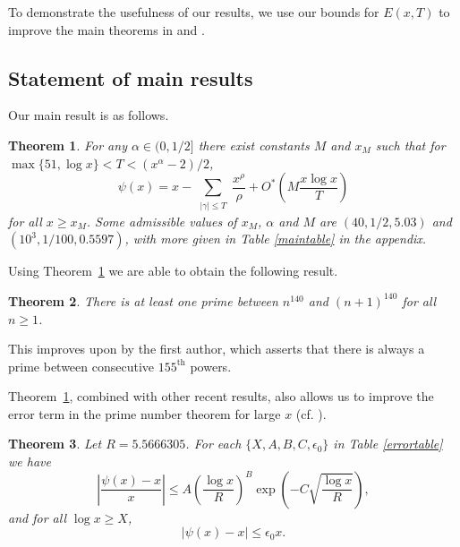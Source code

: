 \documentclass[reqno]{amsart}
\newtheorem{theorem}{Theorem}[section]
\numberwithin{equation}{section}
\theoremstyle{remark}
\begin{document}
To demonstrate the usefulness of our results, we use our bounds for $E(x,T)$ to improve the main theorems in \cite{cully2023primes} and \cite{P_T_2021}.

\subsection{Statement of main results}
Our main result is as follows.
\begin{theorem}\label{mainthm}
    For any $\alpha\in(0,1/2]$ there exist constants $M$ and $x_M$ such that for $\max\{51,\log x\}<T<(x^{\alpha}-2)/2$,
    \begin{equation}\label{oureq}
        \psi(x)=x-\sum_{\substack{|\gamma|\leq T}}\frac{x^\rho}{\rho}+O^*\left(M\frac{x\log x}{T}\right)
    \end{equation}
    for all $x\geq x_M$. Some admissible values of $x_M$, $\alpha$ and $M$ are $(40,1/2,5.03)$ and $(10^3, 1/100, 0.5597)$, with more given in Table \ref{maintable} in the appendix.
\end{theorem}
Using Theorem~\ref{mainthm} we are able to obtain the following result.
\begin{theorem}\label{powerthm}
    There is at least one prime between $n^{140}$ and $(n+1)^{140}$ for all $n\geq 1$.
\end{theorem}
This improves upon \cite[Thm.~1]{cully2023primes} by the first author, which asserts that there is always a prime between consecutive $155^{\text{th}}$ powers.

Theorem~\ref{mainthm}, combined with other recent results, also allows us to improve the error term in the prime number theorem for large $x$ (cf. \cite[Theorem 1]{P_T_2021}).
\begin{theorem}\label{errorthm}
    Let $R=5.5666305$. For each $\{X,A,B,C,\epsilon_0\}$ in Table \ref{errortable} we have
    \begin{equation*}
        \left|\frac{\psi(x)-x}{x}\right|\leq A\left(\frac{\log x}{R}\right)^B\exp\left(-C\sqrt{\frac{\log x}{R}}\right),
    \end{equation*}
    and for all $\log x\geq X$,
    \begin{equation*}
        |\psi(x)-x|\leq\epsilon_0x.
    \end{equation*}
\end{theorem}
\end{document}
